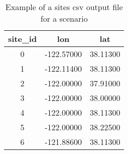 \begin{table}[htbp]
\centering
\begin{tabular}{ccc}

\hline
\rowcolor{lightgray}
\textbf{site\_id} & \textbf{lon} & \textbf{lat} \\
\hline
0 & -122.57000 & 38.11300 \\
1 & -122.11400 & 38.11300 \\
2 & -122.00000 & 37.91000 \\
3 & -122.00000 & 38.00000 \\
4 & -122.00000 & 38.11300 \\
5 & -122.00000 & 38.22500 \\
6 & -121.88600 & 38.11300 \\
\hline

\end{tabular}
\caption{Example of a sites csv output file for a scenario}
\label{output:sitemesh}
\end{table}